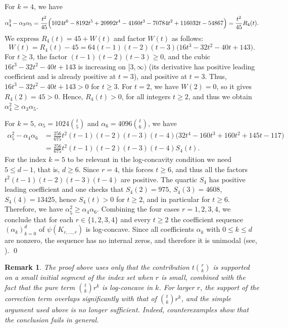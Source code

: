 \documentclass[12pt,twoside]{article}
\newtheorem{remark}[theorem]{Remark}
\renewenvironment{proof}{{\noindent\bfseries Proof.}}{\qed}
\begin{document}
\begin{proof}
		For $k=4$, we have
		\[
		\alpha_4^2 - \alpha_3\alpha_5
		= \frac{t^2}{45}\Bigl(1024t^6 - 8192t^5 + 20992t^4 - 4160t^3
		- 70784t^2 + 116032t - 54867\Bigr)
		= \frac{t^2}{45}R_4(t).
		\]
		We express \( R_4(t) = 45 + W(t) \) and factor \( W(t) \) as follows: \[ W(t) = R_4(t) - 45 = 64(t-1)(t-2)(t-3)\bigl(16t^3 - 32t^2 - 40t + 143\bigr). \]
		For $t\ge 3$, the factor $(t-1)(t-2)(t-3)\ge 0$, and the cubic $16t^3 - 32t^2 - 40t + 143$ is increasing on $[3,\infty)$ (its derivative has positive leading coefficient and is already positive at $t=3$), and positive at $t=3$. Thus, 	$16t^3 - 32t^2 - 40t + 143>0$ for $t\ge 3$. For $t=2$, we have $W(2)=0$, so it gives
		$R_4(2)=45>0$. Hence, $R_4(t)>0$, for all integers $t\ge 2$, and thus we obtain	$\alpha_4^2\ge \alpha_3\alpha_5$.
		
		For $k=5$, $\alpha_5=1024\binom{t}{5}$ and $\alpha_6=4096\binom{t}{6}$, we have
		\begin{align*}
			\alpha_5^2 - \alpha_4\alpha_6&= \frac{256}{675} t^2(t-1)(t-2)(t-3)(t-4) 
		\bigl(32t^4 - 160t^3 + 160t^2 + 145t - 117\bigr)\\
		&= \frac{256}{675} t^2(t-1)(t-2)(t-3)(t-4) S_4(t).
		\end{align*}
		For the index $k=5$ to be relevant in the log-concavity condition we need
		$5\le d-1$, that is, $d\ge 6$. Since $r=4$, this forces $t\ge 6$, and thus
		all the factors $t^2(t-1)(t-2)(t-3)(t-4)$ are positive. The quartic $S_4$ has
		positive leading coefficient and one checks that
		$S_4(2)=975$, $S_4(3)=4608$, $S_4(4)=13425$, hence $S_4(t)>0$ for
		$t\ge 2$, and  in particular for $t\ge 6$. Therefore, we have $\alpha_5^2\ge \alpha_4\alpha_6$. Combining the four cases $r=1,2,3,4$, we conclude that for each $r\in\{1,2,3,4\}$ and every $t\ge 2$ the coefficient sequence $(\alpha_k)_{k=0}^d$	of $\psi(K_{r,\dots,r})$ is log-concave. Since all coefficients $\alpha_k$ with
		$0\le k\le d$ are nonzero, the sequence has no internal zeros, and therefore
		it is unimodal (see, \cite{stanley}).
	\end{proof}
	
	\begin{remark}
		The proof above uses only that the contribution \(t\binom{r}{k}\) is supported on a small initial segment of the index set when \(r\) is small, combined with the fact that the pure term \(\binom{t}{k}r^k\) is log-concave in \(k\). For larger \(r\), the support of the correction term overlaps significantly with that of \(\binom{t}{k}r^k\), and the simple argument used above is no longer sufficient. Indeed, counterexamples show that the conclusion fails in general.
	\end{remark}
	
\end{document}
